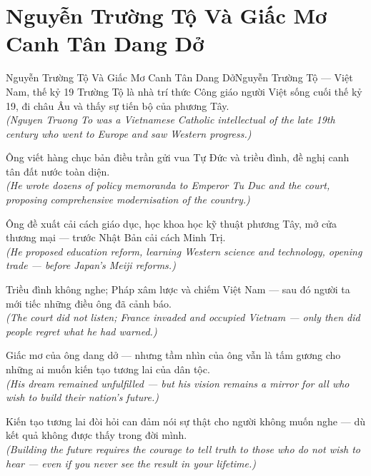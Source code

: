 \section{Nguyễn Trường Tộ Và Giấc Mơ Canh Tân Dang Dở}
\begin{truyen}{Nguyễn Trường Tộ Và Giấc Mơ Canh Tân Dang Dở}{Nguyễn Trường Tộ --- Việt Nam, thế kỷ 19}
 Trường Tộ là nhà trí thức Công giáo người Việt sống cuối thế kỷ 19, đi châu Âu và thấy sự tiến bộ của phương Tây.\\[4pt]
\textit{(Nguyen Truong To was a Vietnamese Catholic intellectual of the late 19th century who went to Europe and saw Western progress.)}

Ông viết hàng chục bản điều trần gửi vua Tự Đức và triều đình, đề nghị canh tân đất nước toàn diện.\\[4pt]
\textit{(He wrote dozens of policy memoranda to Emperor Tu Duc and the court, proposing comprehensive modernisation of the country.)}

Ông đề xuất cải cách giáo dục, học khoa học kỹ thuật phương Tây, mở cửa thương mại --- trước Nhật Bản cải cách Minh Trị.\\[4pt]
\textit{(He proposed education reform, learning Western science and technology, opening trade --- before Japan's Meiji reforms.)}

Triều đình không nghe; Pháp xâm lược và chiếm Việt Nam --- sau đó người ta mới tiếc những điều ông đã cảnh báo.\\[4pt]
\textit{(The court did not listen; France invaded and occupied Vietnam --- only then did people regret what he had warned.)}

Giấc mơ của ông dang dở --- nhưng tầm nhìn của ông vẫn là tấm gương cho những ai muốn kiến tạo tương lai của dân tộc.\\[4pt]
\textit{(His dream remained unfulfilled --- but his vision remains a mirror for all who wish to build their nation's future.)}

\end{truyen}
\begin{baihoc}
  Kiến tạo tương lai đòi hỏi can đảm nói sự thật cho người không muốn nghe --- dù kết quả không được thấy trong đời mình.\\[4pt]
  \textit{(Building the future requires the courage to tell truth to those who do not wish to hear --- even if you never see the result in your lifetime.)}
\end{baihoc}
